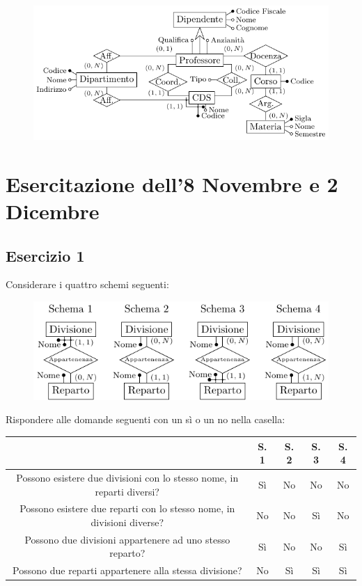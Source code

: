 \documentclass{article}
\numberwithin{equation}{subsection}
\begin{document}
\begin{figure}[H]%
    \centering%
    \includegraphics[scale=1.25]{esercizio_4_29-11-24.pdf}%
\end{figure}

\clearpage

\section{Esercitazione dell'8 Novembre e 2 Dicembre}

\subsection{Esercizio 1}

Considerare i quattro schemi seguenti:
\begin{figure}[H]%
    \centering%
    \includegraphics[scale=1.4]{domanda_8-11-24.pdf}%
\end{figure}

Rispondere alle domande seguenti con un sì o un no nella casella:
\begin{center}
    \begin{tabular}{|c|c|c|c|c|}
        \hline
        & S. 1 & S. 2 & S. 3 & S. 4\\
        \hline
        Possono esistere due divisioni con lo stesso nome, in reparti diversi? & Sì & No & No & No\\
        \hline
        Possono esistere due reparti con lo stesso nome, in divisioni diverse? & No & No & Sì & No\\
        \hline
        Possono due divisioni appartenere ad uno stesso reparto? & Sì & No & No & Sì\\
        \hline
        Possono due reparti appartenere alla stessa divisione? & No & Sì & Sì & Sì\\
        \hline        
    \end{tabular}
\end{center}
\end{document}
